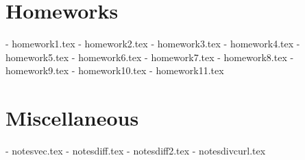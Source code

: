 \section{Homeworks}
- homework1.tex
- homework2.tex
- homework3.tex
- homework4.tex
- homework5.tex
- homework6.tex
- homework7.tex
- homework8.tex
- homework9.tex
- homework10.tex
- homework11.tex

\section{Miscellaneous}
- notesvec.tex
- notesdiff.tex
- notesdiff2.tex
- notesdivcurl.tex
